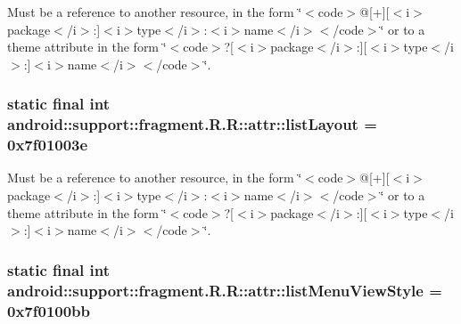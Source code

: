 Must be a reference to another resource, in the form \char`\"{}$<$code$>$@\mbox{[}+\mbox{]}\mbox{[}$<$i$>$package$<$/i$>$:\mbox{]}$<$i$>$type$<$/i$>$:$<$i$>$name$<$/i$>$$<$/code$>$\char`\"{} or to a theme attribute in the form \char`\"{}$<$code$>$?\mbox{[}$<$i$>$package$<$/i$>$:\mbox{]}\mbox{[}$<$i$>$type$<$/i$>$:\mbox{]}$<$i$>$name$<$/i$>$$<$/code$>$\char`\"{}. \hypertarget{classandroid_1_1support_1_1fragment_1_1_r_1_1attr_1fd494ef9ade5f08666affde5b711dcc}{
\subsubsection[{listLayout}]{\setlength{\rightskip}{0pt plus 5cm}static final int android::support::fragment.R.R::attr::listLayout = 0x7f01003e}}
\label{classandroid_1_1support_1_1fragment_1_1_r_1_1attr_1fd494ef9ade5f08666affde5b711dcc}


Must be a reference to another resource, in the form \char`\"{}$<$code$>$@\mbox{[}+\mbox{]}\mbox{[}$<$i$>$package$<$/i$>$:\mbox{]}$<$i$>$type$<$/i$>$:$<$i$>$name$<$/i$>$$<$/code$>$\char`\"{} or to a theme attribute in the form \char`\"{}$<$code$>$?\mbox{[}$<$i$>$package$<$/i$>$:\mbox{]}\mbox{[}$<$i$>$type$<$/i$>$:\mbox{]}$<$i$>$name$<$/i$>$$<$/code$>$\char`\"{}. \hypertarget{classandroid_1_1support_1_1fragment_1_1_r_1_1attr_0af60a4cd6e1ead1dd1f89078e442bf0}{
\subsubsection[{listMenuViewStyle}]{\setlength{\rightskip}{0pt plus 5cm}static final int android::support::fragment.R.R::attr::listMenuViewStyle = 0x7f0100bb}}
\label{classandroid_1_1support_1_1fragment_1_1_r_1_1attr_0af60a4cd6e1ead1dd1f89078e442bf0}


